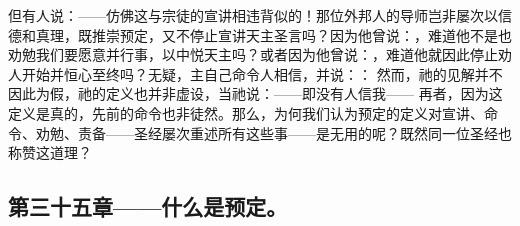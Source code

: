 但有人说：——仿佛这与宗徒的宣讲相违背似的！那位外邦人的导师岂非屡次以信德和真理，既推崇预定，又不停止宣讲天主圣言吗？因为他曾说：，难道他不是也劝勉我们要愿意并行事，以中悦天主吗？或者因为他曾说：，难道他就因此停止劝人开始并恒心至终吗？无疑，主自己命令人相信，并说：： 然而，祂的见解并不因此为假，祂的定义也并非虚设，当祂说：——即没有人信我—— 再者，因为这定义是真的，先前的命令也非徒然。那么，为何我们认为预定的定义对宣讲、命令、劝勉、责备——圣经屡次重述所有这些事——是无用的呢？既然同一位圣经也称赞这道理？\par


\subsection{第三十五章——什么是预定。}

